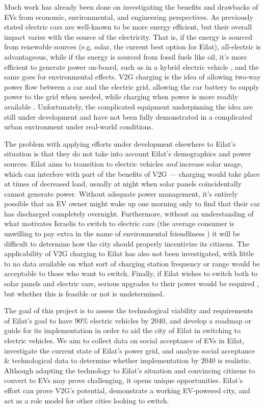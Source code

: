 \documentclass{report}                         %
\begin{document}
Much work has already been done on investigating the benefits and drawbacks of EVs from economic, environmental, and engineering perspectives. As previously stated electric cars are well-known to be more energy efficient, but their overall impact varies with the source of the electricity. That is, if the energy is sourced from renewable sources (e.g. solar, the current best option for Eilat), all-electric is advantageous, while if the energy is sourced from fossil fuels like oil, it's more efficient to generate power on-board, such as in a hybrid electric vehicle \cite{Dincer2010EconomicOptions}, and the same goes for environmental effects. V2G charging is the idea of allowing two-way power flow between a car and the electric grid, allowing the car battery to supply power to the grid when needed, while charging when power is more readily available \cite{Mahmud2015PowerEV}. Unfortunately, the complicated equipment underpinning the idea are still under development \cite{2018Nuvve...} and have not been fully demonstrated in a complicated urban environment under real-world conditions.

The problem with applying efforts under development elsewhere to Eilat's situation is that they do not take into account Eilat's demographics and power sources. Eilat aims to transition to electric vehicles \textit{and} increase solar usage, which can interfere with part of the benefits of V2G --- charging would take place at times of decreased load, usually at night when solar panels coincidentally cannot generate power. Without adequate power management, it's entirely possible that an EV owner might wake up one morning only to find that their car has discharged completely overnight. Furthermore, without an understanding of what motivates Israelis to switch to electric cars (the average consumer is unwilling to pay extra in the name of environmental friendliness \cite{Mock2010MarketVehicles}) it will be difficult to determine how the city should properly incentivize its citizens. The applicability of V2G charging to Eilat has also not been investigated, with little to no data available on what sort of charging station frequency or range would be acceptable to those who want to switch. Finally, if Eilat wishes to switch both to solar panels and electric cars, serious upgrades to their power would be required \cite{Vardimon2011AssessmentIsrael}, but whether this is feasible or not is undetermined.

The goal of this project is to assess the technological viability and requirements of Eilat's goal to have 90\% electric vehicles by 2040, and develop a roadmap or guide for its implementation in order to aid the city of Eilat in switching to electric vehicles.
We aim to collect data on social acceptance of EVs in Eilat, investigate the current state of Eilat's power grid, and analyze social acceptance \& technological data to determine whether implementation by 2040 is realistic. Although adapting the technology to Eilat's situation and convincing citizens to convert to EVs may prove challenging, it opens unique opportunities. Eilat's effort can prove V2G's potential, demonstrate a working EV-powered city, and act as a role model for other cities looking to switch.
\end{document}
